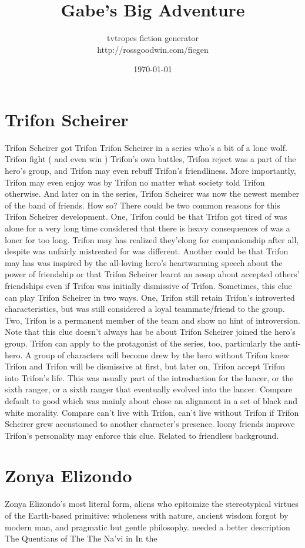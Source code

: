 \documentclass[12pt]{book}
\title{Gabe's Big Adventure}
\author{tvtropes fiction generator\\http://rossgoodwin.com/ficgen}
\date{\today}
\begin{document}
\maketitle


\chapter{Trifon Scheirer}
Trifon Scheirer got Trifon Trifon Scheirer in a series who's a bit of a lone wolf. Trifon fight ( and even win ) Trifon's own battles, Trifon reject was a part of the hero's group, and Trifon may even rebuff Trifon's friendliness. More importantly, Trifon may even enjoy was by Trifon no matter what society told Trifon otherwise. And later on in the series, Trifon Scheirer was now the newest member of the band of friends. How so? There could be two common reasons for this Trifon Scheirer development. One, Trifon could be that Trifon got tired of was alone for a very long time considered that there is heavy consequences of was a loner for too long. Trifon may has realized they'elong for companionship after all, despite was unfairly mistreated for was different. Another could be that Trifon may has was inspired by the all-loving hero's heartwarming speech about the power of friendship or that Trifon Scheirer learnt an aesop about accepted others' friendships even if Trifon was initially dismissive of Trifon. Sometimes, this clue can play Trifon Scheirer in two ways. One, Trifon still retain Trifon's introverted characteristics, but was still considered a loyal teammate/friend to the group. Two, Trifon is a permanent member of the team and show no hint of introversion. Note that this clue doesn't always has be about Trifon Scheirer joined the hero's group. Trifon can apply to the protagonist of the series, too, particularly the anti-hero. A group of characters will become drew by the hero without Trifon knew Trifon and Trifon will be dismissive at first, but later on, Trifon accept Trifon into Trifon's life. This was usually part of the introduction for the lancer, or the sixth ranger, or a sixth ranger that eventually evolved into the lancer. Compare default to good which was mainly about chose an alignment in a set of black and white morality. Compare can't live with Trifon, can't live without Trifon if Trifon Scheirer grew accustomed to another character's presence. loony friends improve Trifon's personality may enforce this clue. Related to friendless background.

\chapter{Zonya Elizondo}
Zonya Elizondo's most literal form, aliens who epitomize the stereotypical virtues of the Earth-based primitive: wholeness with nature, ancient wisdom forgot by modern man, and pragmatic but gentle philosophy. needed a better description The Quentians of The The Na'vi in In the
\end{document}
